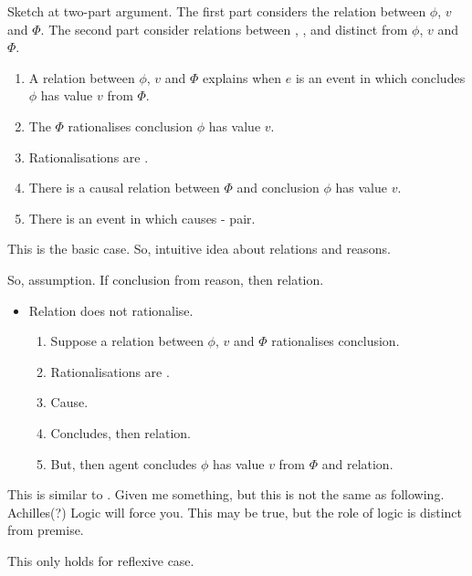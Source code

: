 \begin{note}
  Sketch at two-part argument.
  The first part considers the relation between \(\phi\), \(v\) and \(\Phi\).
  The second part consider relations between , , and  distinct from \(\phi\), \(v\) and \(\Phi\).

  \begin{enumerate}[noitemsep]
  \item
    A relation between \(\phi\), \(v\) and \(\Phi\) explains when \(e\) is an event in which \vAgent{} concludes \(\phi\) has value \(v\) from \(\Phi\).
  \item
    The \pool{} \(\Phi\) rationalises  conclusion \(\phi\) has value \(v\).
  \item
    Rationalisations are \cExpl{}.
  \item
    There is a causal relation between \(\Phi\) and  conclusion \(\phi\) has value \(v\).
  \item
    There is an event in which \pool{} causes - pair.
  \end{enumerate}

  \noindent%
  This is the basic case.
  So, intuitive idea about relations and reasons.

  So, assumption.
  If conclusion from reason, then relation.

  \begin{itemize}
  \item
    Relation does not rationalise.
    \begin{enumerate}[noitemsep]
    \item
      Suppose a relation between \(\phi\), \(v\) and \(\Phi\) rationalises conclusion.
    \item
      Rationalisations are \cExpl{}.
    \item
      Cause.
    \item
      Concludes, then relation.
    \item
      But, then agent concludes \(\phi\) has value \(v\) from \(\Phi\) and relation.
    \end{enumerate}
  \end{itemize}

  This is similar to \citeauthor{Carroll:1895uj}.
  Given me something, but this is not the same as following.
  Achilles(?) Logic will force you.
  This may be true, but the role of logic is distinct from premise.

  This only holds for reflexive case.


\end{note}
